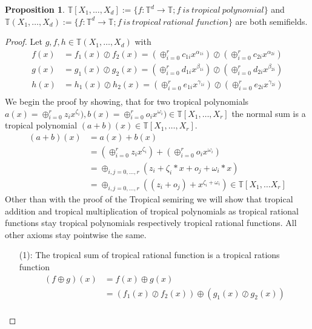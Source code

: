\documentclass{article}
\theoremstyle{definition}
\newtheorem{proposition}[theorem]{Proposition}
\begin{document}
\begin{proposition}
$\mathbb{T}[X_1, \dots , X_d] := \{ f: \mathbb{T}^{d} \to \mathbb{T} ; f \ is \ tropical \ polynomial \}$ and \ $ \mathbb{T}(X_1, \dots , X_d) := \{ f: \mathbb{T}^{d} \to \mathbb{T} ; f \ is \ tropical \ rational \ function \}$ are both semifields. \cite[p.~3]{zhang2018tropical}
\end{proposition}
\begin{proof}
Let $g,f,h \in \mathbb{T}(X_1, \dots ,X_d)$ with 
\begin{align*}
f(x) &= f_1(x) \oslash f_2(x) = (\oplus_{i=0}^r c_{1i} x^{\alpha_{1i}}) \oslash (\oplus_{i=0}^r c_{2i} x^{\alpha_{2i}}) \\
g(x) &= g_1(x) \oslash g_2(x) = (\oplus_{i=0}^r d_{1i} x^{\beta_{1i}}) \oslash (\oplus_{i=0}^r d_{2i} x^{\beta_{2i}}) \\
h(x) &= h_1(x) \oslash h_2(x) = (\oplus_{i=0}^r e_{1i} x^{\gamma_{1i}}) \oslash (\oplus_{i=0}^r e_{2i} x^{\gamma_{2i}}) \\
\end{align*}
We begin the proof by showing, that for two tropical polynomials $a(x)= \oplus_{i=0}^r z_{i} x^{\zeta_{i}}), b(x)= \oplus_{i=0}^r o_{i} x^{\omega_{i}}) \in \mathbb{T}[X_1, \dots , X_r]$ the normal sum is a tropical polynomial $(a + b)(x) \in \mathbb{T}[X_1, \dots , X_r]$.
\begin{align*} 
(a + b)(x) &= a(x) + b(x) \\
&=  (\oplus_{i=0}^r z_{i} x^{\zeta_{i}}) + (\oplus_{i=0}^r o_{i} x^{\omega_{i}}) \\
&= \oplus_{i, j = 0, \dots , r} (z_{i} + \zeta_{i} * x + o_{j} + \omega_{i} * x) \\
&= \oplus_{i, j = 0, \dots , r} ((z_{i} + o_{j}) + x^{\zeta_{i} + \omega_{i}}) \in \mathbb{T}[X_1, \dots X_r]
\end{align*}
Other than with the proof of the Tropical semiring we will show that tropical addition and tropical multiplication of tropical polynomials as tropical rational functions stay tropical polynomials respectively tropical rational functions. All other axioms stay pointwise the same.
\begin{itemize}
\item[(1):]
The tropical sum of tropical rational function is a tropical rations function
\begin{align*}
(f \oplus g)(x) &= f(x) \oplus g(x) \\
&=(f_1(x) \oslash f_2(x)) \oplus (g_1(x) \oslash g_2(x)) \\

\end{align*}
\end{itemize}
\end{proof}
\end{document}
